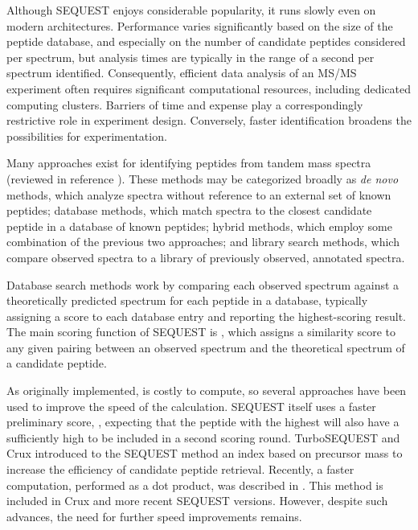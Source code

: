 Although SEQUEST enjoys considerable popularity, it runs slowly even
on modern architectures. Performance varies significantly based on the
size of the peptide database, and especially on the number of
candidate peptides considered per spectrum, but analysis times are
typically in the range of a second per spectrum identified.  Consequently,
efficient data
analysis of an MS/MS experiment often requires significant
computational resources, including dedicated computing
clusters. Barriers of time and expense play a correspondingly
restrictive role in experiment design. Conversely, faster
identification broadens the possibilities for experimentation.

Many approaches exist for identifying peptides from tandem mass spectra
(reviewed in reference \cite{nesvizhskii:analysis}). These methods may
be categorized broadly
as {\it de novo} methods, which analyze spectra without reference to
an external set of known peptides; database methods, which match
spectra to the closest candidate peptide in a database of known
peptides; hybrid methods, which employ some combination of the
previous two approaches; and library search methods, which compare
observed spectra to a library of previously observed, annotated
spectra.

Database search methods work by comparing each observed spectrum
against a theoretically predicted spectrum for each peptide in a
database, typically assigning a score to each database entry and
reporting the highest-scoring result. The main scoring function of
SEQUEST is \XCorr \cite{eng:approach, eng:fast}, which assigns a
similarity score to any given pairing between an observed spectrum and
the theoretical spectrum of a candidate peptide.

As originally implemented, \XCorr is costly to compute, so several
approaches have been used to improve the speed of the \XCorr
calculation. SEQUEST itself uses a faster preliminary score, \Sp,
expecting that the peptide with the highest \XCorr will also have a
sufficiently high \Sp to be included in a second scoring
round. TurboSEQUEST and Crux \cite{park:rapid} introduced to the
SEQUEST method an index
based on precursor mass to increase the efficiency of candidate
peptide retrieval.  Recently, a faster \XCorr computation,
performed as a dot product, was described in \cite{eng:fast}. This
method is included in Crux and more recent SEQUEST versions. However, despite
such advances, the need for further speed improvements remains.

